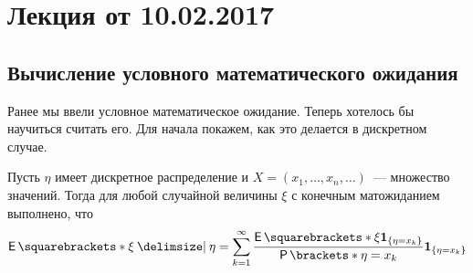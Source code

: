 \section{Лекция от 10.02.2017}
\subsection{Вычисление условного математического ожидания}
Ранее мы ввели условное математическое ожидание. Теперь хотелось бы научиться считать его. Для начала покажем, как это делается в дискретном случае.
\begin{theorem}
	Пусть \(\eta\) имеет дискретное распределение и \(X = (x_1, \dots, x_n, 
	\dots)\)~--- множество значений. Тогда для любой случайной величины \(\xi\) с конечным матожиданием
	выполнено, что
	\[
		\E{\xi \given \eta} = \sum_{k = 1}^{\infty} 
		\frac{\E{\xi\mathbf{1}_{\{\eta = x_{k}\}}}}{\Pr{\eta = x_{k}}} 
		\mathbf{1}_{\{\eta = x_{k}\}}
	\]
\end{theorem}
